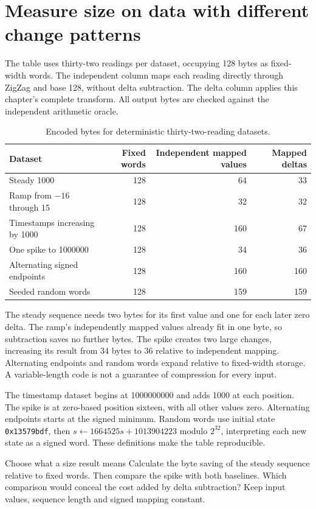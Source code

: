 \section{Measure size on data with different change patterns}
The table uses thirty-two readings per dataset, occupying 128 bytes as fixed-width
words. The independent column maps each reading directly through ZigZag and base 128,
without delta subtraction. The delta column applies this chapter's complete transform.
All output bytes are checked against the independent arithmetic oracle.
\begin{table}[htbp]
\centering
\caption{Encoded bytes for deterministic thirty-two-reading datasets.}
\begin{tabular}{lrrr}
\toprule
Dataset & Fixed words & Independent mapped values & Mapped deltas\\
\midrule
Steady 1000 & 128 & 64 & 33\\
Ramp from \(-16\) through 15 & 128 & 32 & 32\\
Timestamps increasing by 1000 & 128 & 160 & 67\\
One spike to 1000000 & 128 & 34 & 36\\
Alternating signed endpoints & 128 & 160 & 160\\
Seeded random words & 128 & 159 & 159\\
\bottomrule
\end{tabular}
\end{table}

The steady sequence needs two bytes for its first value and one for each later zero
delta. The ramp's independently mapped values already fit in one byte, so subtraction
saves no further bytes. The spike creates two large changes, increasing its result from
34 bytes to 36 relative to independent mapping. Alternating endpoints and random words
expand relative to fixed-width storage. A variable-length code is not a guarantee of
compression for every input.

The timestamp dataset begins at 1000000000 and adds 1000 at each position. The spike
is at zero-based position sixteen, with all other values zero. Alternating endpoints
starts at the signed minimum. Random words use initial state \texttt{0x13579bdf},
then \(s\gets1664525s+1013904223\) modulo \(2^{32}\), interpreting each new state
as a signed word. These definitions make the table reproducible.

\begin{MARSExercise}{Choose what a size result means}
Calculate the byte saving of the steady sequence relative to fixed words. Then compare
the spike with both baselines. Which comparison would conceal the cost added by delta
subtraction? Keep input values, sequence length and signed mapping constant.
\end{MARSExercise}
